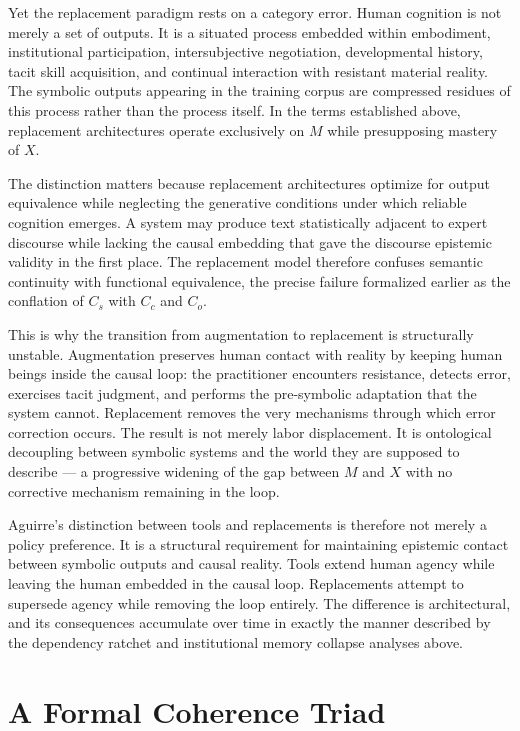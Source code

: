 \documentclass[12pt, a4paper]{article}
\theoremstyle{remark}
\begin{document}
Yet the replacement paradigm rests on a category error. Human cognition is not merely a set of outputs. It is a situated process embedded within embodiment, institutional participation, intersubjective negotiation, developmental history, tacit skill acquisition, and continual interaction with resistant material reality. The symbolic outputs appearing in the training corpus are compressed residues of this process rather than the process itself. In the terms established above, replacement architectures operate exclusively on $M$ while presupposing mastery of $X$.

The distinction matters because replacement architectures optimize for output equivalence while neglecting the generative conditions under which reliable cognition emerges. A system may produce text statistically adjacent to expert discourse while lacking the causal embedding that gave the discourse epistemic validity in the first place. The replacement model therefore confuses semantic continuity with functional equivalence, the precise failure formalized earlier as the conflation of $C_s$ with $C_c$ and $C_o$.

This is why the transition from augmentation to replacement is structurally unstable. Augmentation preserves human contact with reality by keeping human beings inside the causal loop: the practitioner encounters resistance, detects error, exercises tacit judgment, and performs the pre-symbolic adaptation that the system cannot. Replacement removes the very mechanisms through which error correction occurs. The result is not merely labor displacement. It is ontological decoupling between symbolic systems and the world they are supposed to describe --- a progressive widening of the gap between $M$ and $X$ with no corrective mechanism remaining in the loop.

Aguirre's distinction between tools and replacements is therefore not merely a policy preference. It is a structural requirement for maintaining epistemic contact between symbolic outputs and causal reality. Tools extend human agency while leaving the human embedded in the causal loop. Replacements attempt to supersede agency while removing the loop entirely. The difference is architectural, and its consequences accumulate over time in exactly the manner described by the dependency ratchet and institutional memory collapse analyses above.

\section{A Formal Coherence Triad}
\end{document}
